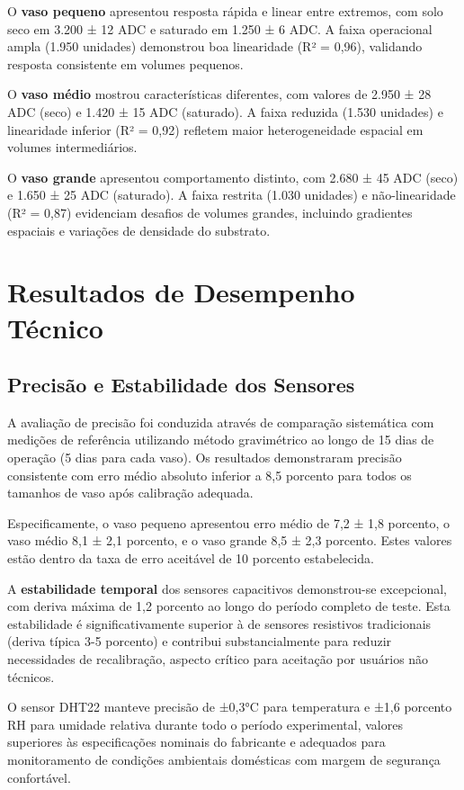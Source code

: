 \documentclass[oneside,english,brazilian]{UNISINOSmonografia}
\begin{document}
O \textbf{vaso pequeno} apresentou resposta rápida e linear entre extremos, com solo seco em 3.200 ± 12 ADC e saturado em 1.250 ± 6 ADC. A faixa operacional ampla (1.950 unidades) demonstrou boa linearidade (R² = 0,96), validando resposta consistente em volumes pequenos.

O \textbf{vaso médio} mostrou características diferentes, com valores de 2.950 ± 28 ADC (seco) e 1.420 ± 15 ADC (saturado). A faixa reduzida (1.530 unidades) e linearidade inferior (R² = 0,92) refletem maior heterogeneidade espacial em volumes intermediários.

O \textbf{vaso grande} apresentou comportamento distinto, com 2.680 ± 45 ADC (seco) e 1.650 ± 25 ADC (saturado). A faixa restrita (1.030 unidades) e não-linearidade (R² = 0,87) evidenciam desafios de volumes grandes, incluindo gradientes espaciais e variações de densidade do substrato.

\section{Resultados de Desempenho Técnico}

\subsection{Precisão e Estabilidade dos Sensores}

A avaliação de precisão foi conduzida através de comparação sistemática com medições de referência utilizando método gravimétrico ao longo de 15 dias de operação (5 dias para cada vaso). Os resultados demonstraram precisão consistente com erro médio absoluto inferior a 8,5 porcento para todos os tamanhos de vaso após calibração adequada.

Especificamente, o vaso pequeno apresentou erro médio de 7,2 ± 1,8 porcento, o vaso médio 8,1 ± 2,1 porcento, e o vaso grande 8,5 ± 2,3 porcento. Estes valores estão dentro da taxa de erro aceitável de 10 porcento estabelecida.

A \textbf{estabilidade temporal} dos sensores capacitivos demonstrou-se excepcional, com deriva máxima de 1,2 porcento ao longo do período completo de teste. Esta estabilidade é significativamente superior à de sensores resistivos tradicionais (deriva típica 3-5 porcento) e contribui substancialmente para reduzir necessidades de recalibração, aspecto crítico para aceitação por usuários não técnicos.

O sensor DHT22 manteve precisão de ±0,3°C para temperatura e ±1,6 porcento RH para umidade relativa durante todo o período experimental, valores superiores às especificações nominais do fabricante e adequados para monitoramento de condições ambientais domésticas com margem de segurança confortável.
\end{document}
